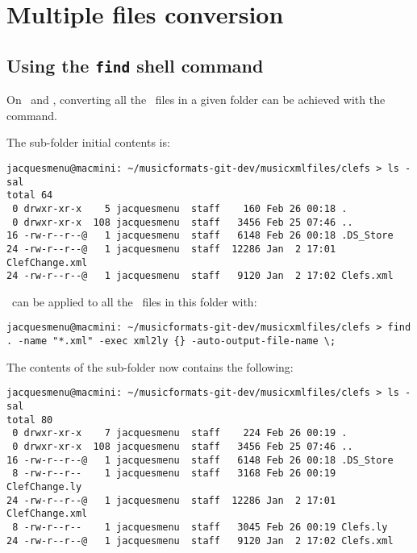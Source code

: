 
\chapter{Multiple files conversion}

\section{Using the {\tt find} shell command}

On \MacOS\ and \Linux, converting all the \mxml\ files in a given folder can be achieved with the  command.

The  sub-folder initial contents is:
\begin{lstlisting}[language=Terminal]
jacquesmenu@macmini: ~/musicformats-git-dev/musicxmlfiles/clefs > ls -sal
total 64
 0 drwxr-xr-x    5 jacquesmenu  staff    160 Feb 26 00:18 .
 0 drwxr-xr-x  108 jacquesmenu  staff   3456 Feb 25 07:46 ..
16 -rw-r--r--@   1 jacquesmenu  staff   6148 Feb 26 00:18 .DS_Store
24 -rw-r--r--@   1 jacquesmenu  staff  12286 Jan  2 17:01 ClefChange.xml
24 -rw-r--r--@   1 jacquesmenu  staff   9120 Jan  2 17:02 Clefs.xml
\end{lstlisting}

\xmlToLy\ can be applied to all the \mxml\ files in this folder with:
\begin{lstlisting}[language=Terminal]
jacquesmenu@macmini: ~/musicformats-git-dev/musicxmlfiles/clefs > find . -name "*.xml" -exec xml2ly {} -auto-output-file-name \;
\end{lstlisting}

The contents of the sub-folder now contains the following:
\begin{lstlisting}[language=Terminal]
jacquesmenu@macmini: ~/musicformats-git-dev/musicxmlfiles/clefs > ls -sal
total 80
 0 drwxr-xr-x    7 jacquesmenu  staff    224 Feb 26 00:19 .
 0 drwxr-xr-x  108 jacquesmenu  staff   3456 Feb 25 07:46 ..
16 -rw-r--r--@   1 jacquesmenu  staff   6148 Feb 26 00:18 .DS_Store
 8 -rw-r--r--    1 jacquesmenu  staff   3168 Feb 26 00:19 ClefChange.ly
24 -rw-r--r--@   1 jacquesmenu  staff  12286 Jan  2 17:01 ClefChange.xml
 8 -rw-r--r--    1 jacquesmenu  staff   3045 Feb 26 00:19 Clefs.ly
24 -rw-r--r--@   1 jacquesmenu  staff   9120 Jan  2 17:02 Clefs.xml
\end{lstlisting}


